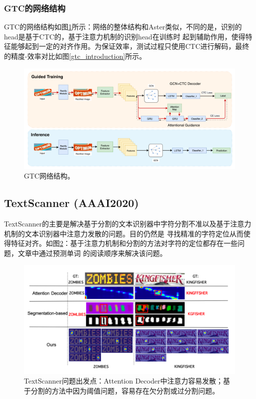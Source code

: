 \subsubsection{GTC的网络结构}
GTC的网络结构如图\ref{gtc_framework}所示：网络的整体结构和Aster类似，不同的是，识别的head是基于CTC的，基于注意力机制的识别head在训练时
起到辅助作用，使得特征能够起到一定的对齐作用。为保证效率，测试过程只使用CTC进行解码，最终的精度-效率对比如图\ref{gtc_introduction}所示。
\begin{figure}[H]
    \centering
    \includegraphics[width=.98\textwidth]{figure/recognition/gtc_framework.png} 
    \caption{GTC网络结构。} 
    \label{gtc_framework} 
\end{figure}


\subsection{TextScanner (AAAI2020)}
TextScanner\cite{wan2019textscanner}的主要是解决基于分割的文本识别器中字符分割不准以及基于注意力机制的文本识别器中注意力发散的问题。目的仍然是
寻找精准的字符定位从而使得特征对齐。如图\ref{textscanner_introduction}：基于注意力机制和分割的方法对字符的定位都存在一些问题，文章中通过预测单词
的阅读顺序来解决该问题。

\begin{figure}[H]
    \centering
    \includegraphics[width=.8\textwidth]{figure/recognition/textscanner_introduction.png} 
    \caption{TextScanner问题出发点：Attention Decoder中注意力容易发散；基于分割的方法中因为阈值问题，容易存在欠分割或过分割问题。} 
    \label{textscanner_introduction} 
\end{figure}

